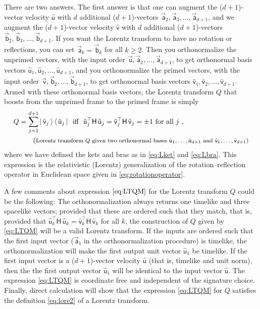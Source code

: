 \documentclass{article}
\newcommand{\metric}{\mathsf{H}}
\newcommand\upvec[1]{\!\vec{\,\mathrm{#1}}}
\newcommand{\Lvec}[1]{\upvec{\mathsf{#1}}} %
\newcommand{\Lhat}[1]{\hat{\mathsf{#1}}} %
\newcommand{\ketbra}[2]{|\,{#1}\,\rangle\,\langle\,{#2}\,|}
\newcommand{\plus}{\!+\!} %
\begin{document}
There are two answers.
The first answer is that one can augment the ($d\plus1$)-vector velocity $\Lhat{u}$ with $d$ additional ($d\plus1$)-vectors $\Lvec{a}_2,\Lvec{a}_3,\ldots,\Lvec{a}_{d+1}$, and we augment the ($d\plus1$)-vector velocity $\Lhat{v}$ with $d$ additional ($d\plus1$)-vectors $\Lvec{b}_2,\Lvec{b}_3,\ldots,\Lvec{b}_{d+1}$.
If you want the Lorentz transform to have no rotation or reflections, you can set $\Lvec{a}_k=\Lvec{b}_k$ for all $k\geq 2$.
Then you orthonormalize the unprimed vectors, with the input order $\Lvec{u},\Lvec{a}_2,\ldots,\Lvec{a}_{d+1}$, to get orthonormal basis vectors $\Lhat{u}_1,\Lhat{u}_2,\ldots,\Lhat{u}_{d+1}$, and you orthonormalize the primed vectors, with the input order $\Lvec{v},\Lvec{b}_2,\ldots,\Lvec{b}_{d+1}$, to get orthonormal basis vectors $\Lhat{v}_1,\Lhat{v}_2,\ldots,\Lhat{v}_{d+1}$.
Armed with these orthonormal basis vectors, the Lorentz transform $Q$ that boosts from the unprimed frame to the primed frame is simply
\begin{align}
  Q &= \sum_{j=1}^{d+1} \ketbra{\Lhat{v}_j}{\Lhat{u}_j} ~~ \mbox{iff} ~~ \Lhat{u}_j^\top\metric\,\Lhat{u}_j = \Lhat{v}_j^\top\metric\,\Lhat{v}_j = \pm 1 ~ \mbox{for all $j$} \label{eq:LTQM} ~, \\
  & \tag{\footnotesize Lorentz transform $Q$ given two orthonormal bases $\Lhat{u}_1,\ldots,\Lhat{u}_{d+1}$ and $\Lhat{v}_1,\ldots,\Lhat{v}_{d+1}$}
\end{align}
where we have defined the kets and bras as in \eqref{eq:Lket} and \eqref{eq:Lbra}.
This expression is the relativistic (Lorentz) generalization of the rotation--reflection operator in Euclidean space given in \eqref{eq:rotationoperator}.

A few comments about expression $\eqref{eq:LTQM}$ for the Lorentz transform $Q$ could be the following:
The orthonormalization always returns one timelike and three spacelike vectors;
provided that these are ordered such that they match, that is, provided that $\Lhat{u}_k^\top\metric\,\Lhat{u}_k=\Lhat{v}_k^\top\metric\,\Lhat{v}_k$ for all $k$, the construction of $Q$ given by \eqref{eq:LTQM} will be a valid Lorentz transform.
If the inputs are ordered such that the first input vector ($\Lvec{a}_1$ in the orthonormalization procedure) is timelike, the orthonormalization will make the first output unit vector $\Lhat{u}_1$ be timelike.
If the first input vector is a ($d\plus1$)-vector velocity $\Lhat{u}$ (that is, timelike and unit norm), then the the first output vector $\Lhat{u}_1$ will be identical to the input vector $\Lhat{u}$.
The expression \eqref{eq:LTQM} is coordinate free and independent of the signature choice.
Finally, direct calculation will show that the expression \eqref{eq:LTQM} for $Q$ satisfies the definition \eqref{eq:lore2} of a Lorentz transform.
\end{document}
